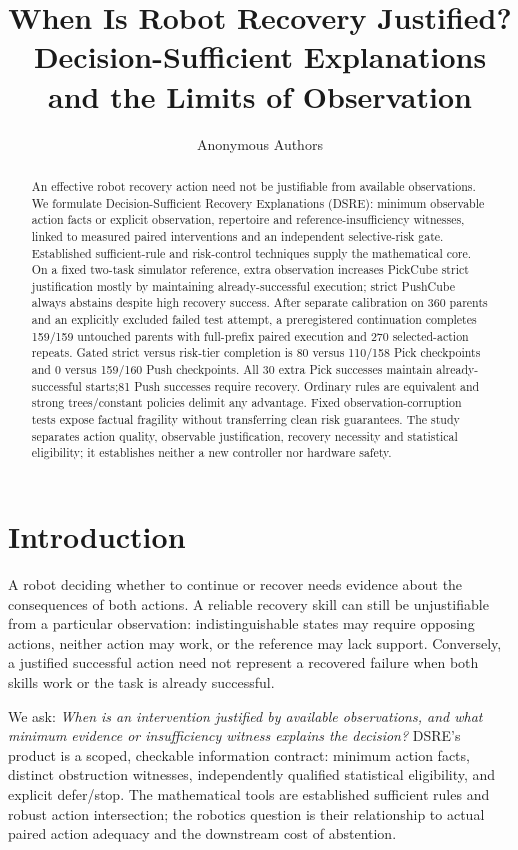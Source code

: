 \documentclass[conference]{IEEEtran}
\title{When Is Robot Recovery Justified?\\Decision-Sufficient Explanations and the Limits of Observation}
\author{Anonymous Authors}
\begin{document}
\maketitle
\begin{abstract}
An effective robot recovery action need not be justifiable from available observations. We formulate Decision-Sufficient Recovery Explanations (DSRE): minimum observable action facts or explicit observation, repertoire and reference-insufficiency witnesses, linked to measured paired interventions and an independent selective-risk gate. Established sufficient-rule and risk-control techniques supply the mathematical core. On a fixed two-task simulator reference, extra observation increases PickCube strict justification mostly by maintaining already-successful execution; strict PushCube always abstains despite high recovery success. After separate calibration on 360 parents and an explicitly excluded failed test attempt, a preregistered continuation completes 159/159 untouched parents with full-prefix paired execution and 270 selected-action repeats. Gated strict versus risk-tier completion is 80 versus 110/158 Pick checkpoints and 0 versus 159/160 Push checkpoints. All 30 extra Pick successes maintain already-successful starts;81 Push successes require recovery. Ordinary rules are equivalent and strong trees/constant policies delimit any advantage. Fixed observation-corruption tests expose factual fragility without transferring clean risk guarantees. The study separates action quality, observable justification, recovery necessity and statistical eligibility; it establishes neither a new controller nor hardware safety.
\end{abstract}

\section{Introduction}
A robot deciding whether to continue or recover needs evidence about the consequences of both actions. A reliable recovery skill can still be unjustifiable from a particular observation: indistinguishable states may require opposing actions, neither action may work, or the reference may lack support. Conversely, a justified successful action need not represent a recovered failure when both skills work or the task is already successful.

We ask: \emph{When is an intervention justified by available observations, and what minimum evidence or insufficiency witness explains the decision?} DSRE's product is a scoped, checkable information contract: minimum action facts, distinct obstruction witnesses, independently qualified statistical eligibility, and explicit defer/stop. The mathematical tools are established sufficient rules and robust action intersection; the robotics question is their relationship to actual paired action adequacy and the downstream cost of abstention.
\end{document}
